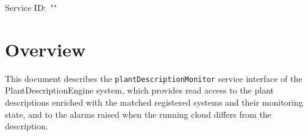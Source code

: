 \documentclass[a4paper]{arrowhead}
\begin{document}
\sloppy

\ArrowheadSetup

\begin{center}
  \vspace*{1cm}
  \huge{\arrowtitle}

  \vspace*{0.2cm}
  \LARGE{\arrowtype}
  \vspace*{1cm}

  \Large{Service ID: \textit{"\arrowid"}}

  \vspace*{\fill}


  \vspace*{1cm}
  \vspace*{\fill}

  \begin{abstract}
    This document describes the HTTP/1.1 protocol with TLS payload security and JSON payload encoding variant of the \texttt{plant\allowbreak{}Description\allowbreak{}Monitor} service of the PlantDescriptionEngine system.
  \end{abstract}

  \vspace*{1cm}
\end{center}

\newpage

\tableofcontents
\newpage

\section{Overview}
\label{sec:overview}

This document describes the \texttt{plant\allowbreak{}Description\allowbreak{}Monitor} service interface of the PlantDescriptionEngine system, which provides read access to the plant descriptions enriched with the matched registered systems and their monitoring state, and to the alarms raised when the running cloud differs from the description.
\end{document}
